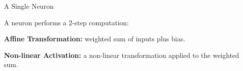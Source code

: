 \documentclass[11pt,compress,t,notes=noshow, xcolor=table]{beamer}
\begin{document}
\begin{framei} {A Single Neuron}
\item A neuron performs a 2-step computation:
\item \textbf{Affine Transformation:} weighted sum of inputs plus bias.
\item \textbf{Non-linear Activation:} a non-linear transformation applied to the weighted sum.
\end{framei}

\end{document}
